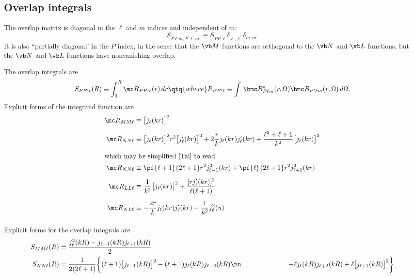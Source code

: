 \documentclass[letterpaper]{article}
\begin{document}
\subsection{Overlap integrals}

The overlap matrix is diagonal in the $\ell$ and $m$
indices and independent of $m$:
$$ S_{P\ell m; P^\prime \ell^\prime m^\prime} 
   \equiv S_{PP^\prime \ell}\delta_{\ell, \ell^\prime} \delta_{m,m^\prime}
$$
It is also ``partially diagonal' in the $P$ index, in the sense that the
$\vb M$ functions are orthogonal to the $\vb N$ and $\vb L$ functions,
but the $\vb N$ and $\vb L$ functions have nonvanishing overlap. 

The overlap integrals are
$$
 S_{PP^\prime \ell}(R) \equiv \int_0^R \mc R_{PP^\prime \ell}(r)\, dr
\qtq{where}
R_{PP^\prime\ell}\equiv \int\,
 \bmc B^*_{P\ell m}(r,\Omega)
 \bmc B_{P^\prime\ell m}(r,\Omega)\,d\Omega.
$$
Explicit forms of the integrand function are
\begin{align*}
\mc R_{MM\ell}&\equiv \big[j_\ell(kr)\big]^2 
\\[5pt]
\mc R_{NN\ell}&\equiv \big[j_\ell(kr)\big]^2 
  r^2 \big[j^\prime_\ell(kr)\big]^2 
 +2\frac{r}{k}j_\ell(kr) j_\ell^\prime(kr)
 +\frac{\ell^2+\ell+1}{k^2}\big[j_\ell(kr)\big]^2
\\[5pt]
\intertext{which may be simplified~\cite{Tai} to read}
\mc R_{NN\ell}&\equiv \pf{\ell+1}{2\ell+1}r^2 j_{\ell-1}^2(kr) 
                    + \pf{\ell}{2\ell+1}r^2 j_{\ell+1}^2(kr)
\\[5pt]
\mc R_{LL\ell}&\equiv 
  \frac{1}{k^2} \big[j_\ell(kr)\big]^2 
  + \frac{[rj_\ell^\prime(kr)]^2}{\ell(\ell+1)}
\\[5pt]
\mc R_{NL\ell}&\equiv 
  -\frac{2r}{k}j_\ell(kr)j^\prime_\ell(kr) - \frac{1}{k^2}j^2_\ell(u)
\\[5pt]
\end{align*}

Explicit forms for the overlap integrals are
\begin{subequations}
\begin{align}
 S_{MM\ell}(R)
&=\frac{j_\ell^2(kR) - j_{\ell-1}(kR) j_{\ell+1}(kR)}{2}
\\
 S_{NN\ell}(R)
&=\frac{1}{2(2\ell+1)}
  \bigg\{    (\ell+1)\big[j_{\ell-1}(kR)\big]^2 
           - (\ell+1)j_{\ell}(kR) j_{\ell-2}(kR)
\nn
&\qquad\qquad\qquad
           - \ell j_{\ell}(kR) j_{\ell+2}(kR)
           + \ell\big[j_{\ell+1}(kR)\big]^2
  \bigg\}
\end{align}
\label{ExplicitOverlapIntegrals}
\end{subequations}
\end{document}
